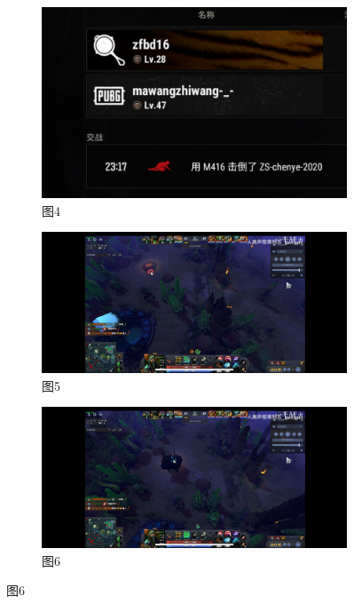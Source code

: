 \documentclass[12pt, a4paper, oneside]{ctexart}
\begin{document}
\begin{figure}[htbp]
    \medskip %

    \begin{subfigure}{0.3\textwidth}
        \centering
        \includegraphics[width=\textwidth]{fig/4.png} %
        \caption{图4}
    \end{subfigure}
    \hfill
    \begin{subfigure}{0.3\textwidth}
        \centering
        \includegraphics[width=\textwidth]{fig/5.png} %
        \caption{图5}
    \end{subfigure}
    \hfill
    \begin{subfigure}{0.3\textwidth}
        \centering
        \includegraphics[width=\textwidth]{fig/6.png} %
        \caption{图6}
    \end{subfigure}


\end{figure}
\end{document}
